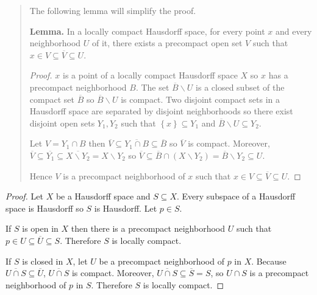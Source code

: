 \begin{quotation}
    The following lemma will simplify the proof.

    \textbf{Lemma.} In a locally compact Hausdorff space, for every point \( x \) and every neighborhood \( U \) of it, there exists a precompact open set \( V \) such that \( x \in V \subseteq \overline{V} \subseteq U \).

    \begin{proof}
        \( x \) is a point of a locally compact Hausdorff space \( X \) so \( x \) has a precompact neighborhood \( B \). The set \( \overline{B} \smallsetminus U \) is a closed subset of the compact set \( \overline{B} \) so \( \overline{B} \smallsetminus U \) is compact. Two disjoint compact sets in a Hausdorff space are separated by disjoint neighborhoods so there exist disjoint open sets \( Y_{1}, Y_{2} \) such that \( \left\{ x \right\} \subseteq Y_{1} \) and \( \overline{B} \smallsetminus U \subseteq Y_{2} \).

        Let \( V = Y_{1} \cap B \) then \( \overline{V} \subseteq \overline{Y_{1} \cap B} \subseteq \overline{B} \) so \( \overline{V} \) is compact. Moreover, \( \overline{V} \subseteq \overline{Y_{1}} \subseteq \overline{X \smallsetminus Y_{2}} = X \smallsetminus Y_{2} \) so \( \overline{V} \subseteq \overline{B} \cap (X \smallsetminus Y_{2}) = \overline{B} \smallsetminus Y_{2} \subseteq U \).

        Hence \( V \) is a precompact neighborhood of \( x \) such that \( x \in V \subseteq \overline{V} \subseteq U \).
    \end{proof}
\end{quotation}

\begin{proof}
    Let \( X \) be a Hausdorff space and \( S \subseteq X \). Every subspace of a Hausdorff space is Hausdorff so \( S \) is Hausdorff. Let \( p \in S \).

    If \( S \) is open in \( X \) then there is a precompact neighborhood \( U \) such that \( p \in U \subseteq \overline{U} \subseteq S \). Therefore \( S \) is locally compact.

    If \( S \) is closed in \( X \), let \( U \) be a precompact neighborhood of \( p \) in \( X \). Because \( \overline{U \cap S} \subseteq \overline{U} \), \( \overline{U \cap S} \) is compact. Moreover, \( \overline{U \cap S} \subseteq \overline{S} = S \), so \( U \cap S \) is a precompact neighborhood of \( p \) in \( S \). Therefore \( S \) is locally compact.
\end{proof}

